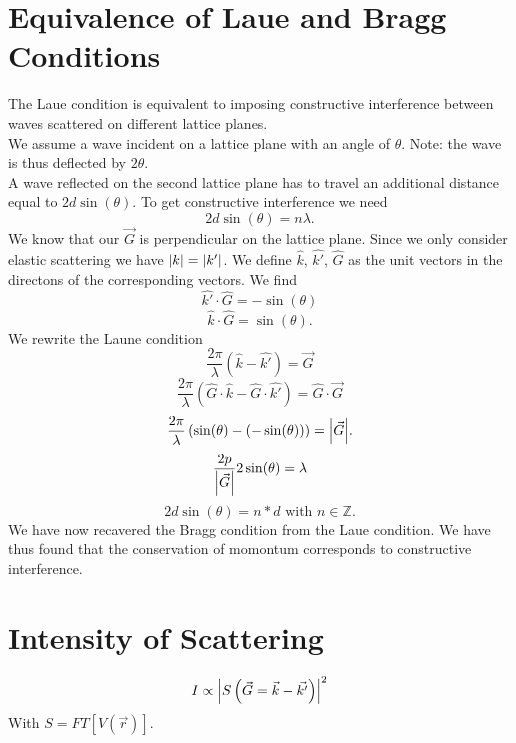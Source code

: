 \documentclass{report}
\begin{document}
\section{Equivalence of Laue and Bragg Conditions}
The Laue condition is equivalent to imposing constructive interference between waves scattered on different lattice planes. \\
We assume a wave incident on a lattice plane with an angle of $\theta$. Note: the wave is thus deflected by $2\theta$.\\
A wave reflected on the second lattice plane has to travel an additional distance equal to $2 d \sin\left( \theta \right) $. To get constructive interference we need \[
	2 d \sin\left( \theta \right) = n \lambda
.\] 
We know that our $\vec{G}$ is perpendicular on the lattice plane. Since we only consider elastic scattering we have $\abs{k} = \abs{k'}$. We define $\hat{k}$, $\hat{k'}$, $\hat{G}$ as the unit vectors in the directons of the corresponding vectors. We find \[
	\hat{k'} \cdot \hat{G} = -\sin\left( \theta \right) 
\] \[
\hat{k} \cdot \hat{G} = \sin\left( \theta \right) 
.\] We rewrite the Laune condition \[
\frac{2\pi}{\lambda} \left( \hat{k} -  \hat{k'} \right) = \vec{G}
\] \[
\frac{2\pi}{\lambda} \left( \hat{G}\cdot \hat{k} - \hat{G}\cdot \hat{k'} \right) = \hat{G} \cdot \vec{G}
\]\[
\frac{2\pi}{\lambda} \left( \sin(\theta) - \left( -\sin(\theta) \right)  \right) = \abs{\vec{G}}
.\]  \[
\frac{2p}{\abs{\vec{G}}} 2 \sin(\theta) = \lambda
\] \[
2d\sin(\theta) = n*d \text{  with } n \in \mathbb{Z} 
.\]  We have now recavered the Bragg condition from the Laue condition. We have thus found that the conservation of momontum corresponds to constructive interference.\\
\section{Intensity of Scattering}
\[
	I \propto \abs{S\left( \vec{G} = \vec{k} - \vec{k'} \right) }^2
\] With $S = FT[V(\vec{r})]$.
\end{document}
